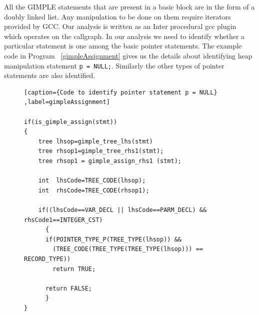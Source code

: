 All the GIMPLE statements that are present in a basic block are in the form of a doubly linked list. Any manipulation to be done on them
require iterators provided by GCC. Our analysis is written as an Inter procedural gcc plugin which operates on the callgraph. In our analysis we 
need to identify whether a particular statement is one among the basic pointer statements.
The example code in Program ~\ref{gimpleAssignment} gives us the details about identifying heap manipulation statement {\tt p = NULL;}. Similarly the other
types of pointer statements are also identified.

\begin{figure}
\begin{lstlisting}[caption={Code to identify pointer statement p = NULL} ,label=gimpleAssignment]
 
if(is_gimple_assign(stmt))
{
    tree lhsop=gimple_tree_lhs(stmt)
    tree rhsop1=gimple_tree_rhs1(stmt);
    tree rhsop1 = gimple_assign_rhs1 (stmt);

    int  lhsCode=TREE_CODE(lhsop);
    int  rhsCode=TREE_CODE(rhsop1);

    if((lhsCode==VAR_DECL || lhsCode==PARM_DECL) && rhsCode1==INTEGER_CST)
      {
	  if(POINTER_TYPE_P(TREE_TYPE(lhsop)) && 
		(TREE_CODE(TREE_TYPE(TREE_TYPE(lhsop))) == RECORD_TYPE))
	    return TRUE;
	  
	  return FALSE;
      }   
}

\end{lstlisting}
\end{figure}

